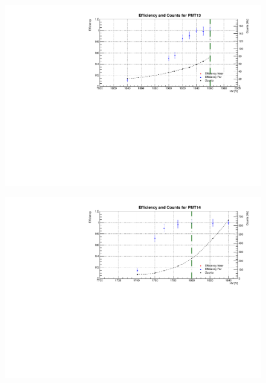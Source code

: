 \begin{figure}[h]
	\centerline{\includegraphics[scale=0.9]{img/eff/eff13.pdf}}
\end{figure}
\begin{figure}[h]
	\centerline{\includegraphics[scale=0.9]{img/eff/eff14.pdf}}
\end{figure}
